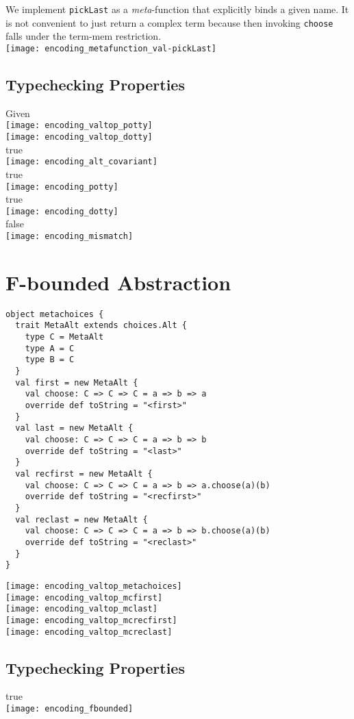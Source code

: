 \documentclass{article}
\begin{document}
We implement {\tt pickLast} as a {\it meta}-function that explicitly binds a
given name. It is not convenient to just return a complex term because
then invoking {\tt choose} falls under the term-mem restriction.\\
\texttt{[image: encoding\_metafunction\_val-pickLast]}

\subsection{Typechecking Properties}
Given\\
\texttt{[image: encoding\_valtop\_potty]}\\
\texttt{[image: encoding\_valtop\_dotty]}\\

true\\ \texttt{[image: encoding\_alt\_covariant]}\\
true\\ \texttt{[image: encoding\_potty]}\\
true\\ \texttt{[image: encoding\_dotty]}\\
false\\ \texttt{[image: encoding\_mismatch]}\\

\section{F-bounded Abstraction}
\begin{verbatim}
object metachoices {
  trait MetaAlt extends choices.Alt {
    type C = MetaAlt
    type A = C
    type B = C
  }
  val first = new MetaAlt {
    val choose: C => C => C = a => b => a
    override def toString = "<first>"
  }
  val last = new MetaAlt {
    val choose: C => C => C = a => b => b
    override def toString = "<last>"
  }
  val recfirst = new MetaAlt {
    val choose: C => C => C = a => b => a.choose(a)(b)
    override def toString = "<recfirst>"
  }
  val reclast = new MetaAlt {
    val choose: C => C => C = a => b => b.choose(a)(b)
    override def toString = "<reclast>"
  }
}
\end{verbatim}
\texttt{[image: encoding\_valtop\_metachoices]}\\
\texttt{[image: encoding\_valtop\_mcfirst]}\\
\texttt{[image: encoding\_valtop\_mclast]}\\
\texttt{[image: encoding\_valtop\_mcrecfirst]}\\
\texttt{[image: encoding\_valtop\_mcreclast]}

\subsection{Typechecking Properties}

true\\ \texttt{[image: encoding\_fbounded]}
\end{document}
